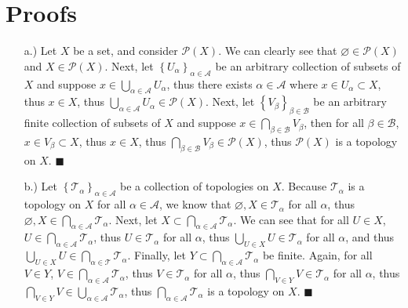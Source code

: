 \documentclass[11pt]{article}
\newcommand{\braces}[1]{\left\{#1\right\}}           %
\begin{document}
\section*{Proofs}
\begin{itemize}
    \item [a.)] Let
    $X$
    be a set, and consider
    $\mathcal{P}(X)$.
    We can clearly see that
    $\varnothing\in\mathcal{P}(X)$
    and
    $X\in\mathcal{P}(X)$.
    Next, let
    $\braces{U_\alpha}_{\alpha\in\mathcal{A}}$
    be an arbitrary collection of subsets of
    $X$
    and suppose
    $\displaystyle x\in\bigcup_{\alpha\in\mathcal{A}}U_\alpha$,
    thus there exists
    $\alpha\in\mathcal{A}$
    where
    $x\in U_\alpha\subset X$,
    thus
    $x\in X$,
    thus
    $\displaystyle \bigcup_{\alpha\in\mathcal{A}}U_\alpha\in\mathcal{P}(X)$.
    Next, let
    $\braces{V_\beta}_{\beta\in\mathcal{B}}$
    be an arbitrary finite collection of subsets of
    $X$
    and suppose
    $\displaystyle x\in\bigcap_{\beta\in\mathcal{B}}V_\beta$,
    then for all 
    $\beta\in\mathcal{B}$, $x\in V_\beta\subset X$,
    thus
    $x\in X$,
    thus
    $\displaystyle \bigcap_{\beta\in\mathcal{B}}V_\beta\in\mathcal{P}(X)$,
    thus
    $\mathcal{P}(X)$
    is a topology on
    $X$.
    $\blacksquare$

    \item [b.)] Let $\braces{\mathcal{T}_\alpha}_{\alpha\in\mathcal{A}}$ be a collection of topologies on $X$. Because $\mathcal{T}_\alpha$ is a topology on $X$ for all $\alpha\in\mathcal{A}$, we know that $\varnothing,X\in\mathcal{T}_\alpha$ for all $\alpha$, thus $\varnothing,X\in\displaystyle \bigcap_{\alpha\in\mathcal{A}}\mathcal{T}_\alpha$.
    Next, let $X\subset\displaystyle\bigcap_{\alpha\in\mathcal{A}}\mathcal{T}_\alpha$. We can see that for all $U\in X$, $U\in\displaystyle\bigcap_{\alpha\in\mathcal{A}}\mathcal{T}_\alpha$, thus $U\in\mathcal{T}_\alpha$ for all $\alpha$, thus $\displaystyle\bigcup_{U\in X}U\in\mathcal{T}_\alpha$ for all $\alpha$, and thus $\displaystyle\bigcup_{U\in X}U\in\bigcap_{\alpha\in\mathcal{T}}\mathcal{T}_\alpha$.
    Finally, let $Y\subset\displaystyle\bigcap_{\alpha\in\mathcal{A}}\mathcal{T}_\alpha$ be finite. Again, for all $V\in Y$, $V\in\displaystyle\bigcap_{\alpha\in\mathcal{A}}\mathcal{T}_\alpha$, thus $V\in\mathcal{T}_\alpha$ for all $\alpha$, thus $\displaystyle\bigcap_{V\in Y}V\in\mathcal{T}_\alpha$ for all $\alpha$, thus $\displaystyle\bigcap_{V\in Y}V\in\bigcup_{\alpha\in\mathcal{A}}\mathcal{T}_\alpha$, thus $\displaystyle\bigcap_{\alpha\in\mathcal{A}}\mathcal{T}_\alpha$ is a topology on $X$. $\blacksquare$


\end{itemize}
\end{document}
